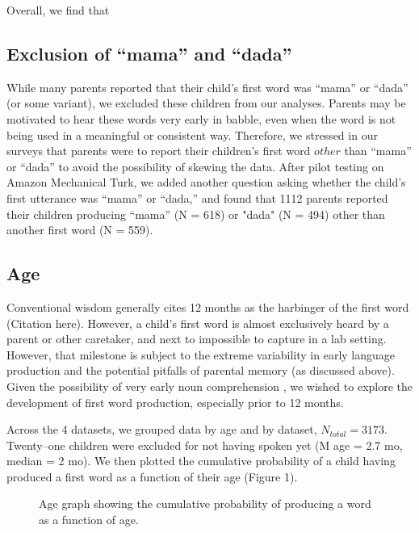 \documentclass[10pt,letterpaper]{article}
\begin{document}
Overall, we find that 

\subsection{Exclusion of ``mama'' and ``dada''}
While many parents reported that their child's first word was ``mama'' or ``dada'' (or some variant), we excluded these children from our analyses. Parents may be motivated to hear these words very early in babble, even when the word is not being used in a meaningful or consistent way. Therefore, we stressed in our surveys that parents were to report their children's first word $other$ than ``mama'' or ``dada'' to avoid the possibility of skewing the data. After pilot testing on Amazon Mechanical Turk, we added another question asking whether the child's first utterance was ``mama'' or ``dada,'' and found that 1112 parents reported their children producing ``mama'' (N = 618) or "dada" (N = 494) other than another first word (N = 559). 

\subsection{Age} 

Conventional wisdom generally cites 12 months as the harbinger of the first word (Citation here). However, a child's first word is almost exclusively heard by a parent or other caretaker, and next to impossible to capture in a lab setting. However, that milestone is subject to the extreme variability in early language production \cite{fenson1994} and the potential pitfalls of parental memory (as discussed above). Given the possibility of very early noun comprehension \cite{tincoff1999,tincoff2012,bergelson2012}, we wished to explore the development of first word production, especially prior to 12 months.

Across the 4 datasets, we grouped data by age and by dataset, $N_{total} = 3173$. Twenty--one children were excluded for not having spoken yet (M age = 2.7 mo, median = 2 mo). We then plotted the cumulative probability of a child having produced a first word as a function of their age (Figure 1).

\begin{figure}[t]
\caption{\label{fig:cdfs} Age graph showing the cumulative probability of producing a word as a function of age.}
\end{figure}
\end{document}
